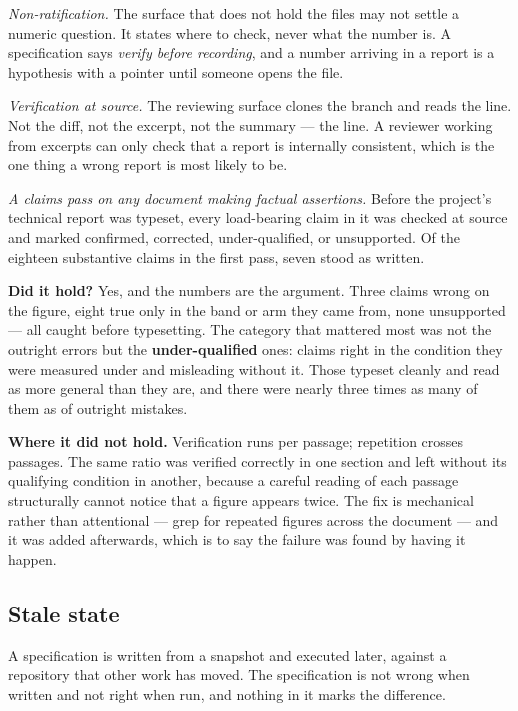 \textit{Non-ratification.} The surface that does not hold the files may not settle a numeric question. It states where to check, never what the number is. A specification says \textit{verify before recording}, and a number arriving in a report is a hypothesis with a pointer until someone opens the file.

\textit{Verification at source.} The reviewing surface clones the branch and reads the line. Not the diff, not the excerpt, not the summary --- the line. A reviewer working from excerpts can only check that a report is internally consistent, which is the one thing a wrong report is most likely to be.

\textit{A claims pass on any document making factual assertions.} Before the project's technical report was typeset, every load-bearing claim in it was checked at source and marked confirmed, corrected, under-qualified, or unsupported. Of the eighteen substantive claims in the first pass, seven stood as written.

\textbf{Did it hold?} Yes, and the numbers are the argument. Three claims wrong on the figure, eight true only in the band or arm they came from, none unsupported --- all caught before typesetting. The category that mattered most was not the outright errors but the \textbf{under-qualified} ones: claims right in the condition they were measured under and misleading without it. Those typeset cleanly and read as more general than they are, and there were nearly three times as many of them as of outright mistakes.

\textbf{Where it did not hold.} Verification runs per passage; repetition crosses passages. The same ratio was verified correctly in one section and left without its qualifying condition in another, because a careful reading of each passage structurally cannot notice that a figure appears twice. The fix is mechanical rather than attentional --- grep for repeated figures across the document --- and it was added afterwards, which is to say the failure was found by having it happen.

\subsection{Stale state}

A specification is written from a snapshot and executed later, against a repository that other work has moved. The specification is not wrong when written and not right when run, and nothing in it marks the difference.


